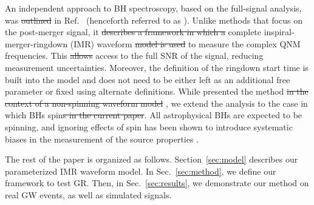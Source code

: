 An independent approach to BH spectroscopy, based on the full-signal
analysis, was \sout{outlined}  in Ref.~\citep{Brito:2018rfr}
(henceforth referred to as \paperone). Unlike methods that focus 
on the post-merger signal, it \sout{describes a framework in which a}
 complete inspiral-merger-ringdown
(IMR) waveform \sout{model is used} to measure the complex QNM
frequencies. This \sout{allows}  access to the full SNR of the signal,
reducing measurement uncertainties. Moreover, the definition of the
ringdown start time is built into the  model and does not need to be
either left as an additional free parameter or fixed using alternate
definitions. While \paperone presented the method \sout{in the context of a
non-spinning waveform model} ,  we extend the analysis to the  case in which BHs  spin\sout{s in the current paper}.   All astrophysical BHs are expected to be spinning,
and ignoring effects of spin has been shown to introduce systematic biases in the measurement of the
source properties \cite{paper_showing_systematics_from_ignoring_spin}.

The rest of the paper is organized as follows. Section~\ref{sec:model} describes our parameterized IMR
waveform model. In Sec.~\ref{sec:method}, we define our framework to test GR. Then, in Sec.~\ref{sec:results},
we demonstrate our method on real GW events, as well as simulated signals. 

